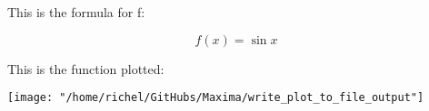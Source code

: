 \documentclass[11]{article}
\begin{document}
This is the formula for f:

$$f\left(x\right)=\sin x$$

This is the function plotted:

\texttt{[image: "/home/richel/GitHubs/Maxima/write\_plot\_to\_file\_output"]}
\end{document}
